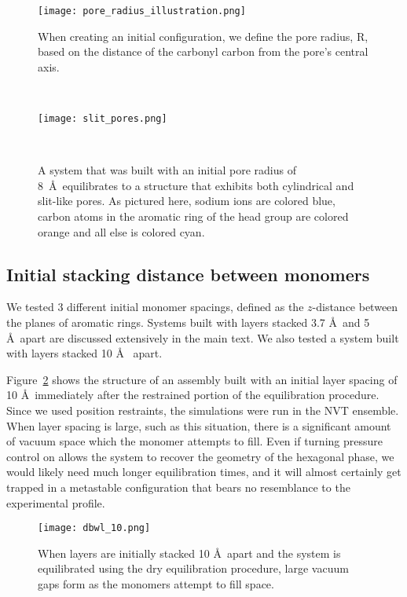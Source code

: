   \begin{figure}[!htb]
  \centering
  \begin{minipage}{0.475\textwidth}
  \centering
  \texttt{[image: pore\_radius\_illustration.png]}
  \caption{When creating an initial configuration, we define the pore radius,
  R, based on the distance of the carbonyl carbon from the pore's
  central axis.}~\label{S-fig:pore_radius_illustration}
  \end{minipage}\qquad
  \begin{minipage}{0.475\textwidth}
  \centering
  \vspace{4em}
  \texttt{[image: slit\_pores.png]}
  \vspace{1em}
  \caption{A system that was built with an initial pore radius of 8~\AA~equilibrates
  to a structure that exhibits both cylindrical and slit-like pores. As pictured 
  here, sodium ions are colored blue, carbon atoms in the aromatic ring of the head 
  group are colored orange and all else is colored cyan.}~\label{S-fig:slits}
  \end{minipage}
  \end{figure}

  \subsection{Initial stacking distance between monomers}\label{S-section:initial_dbwl}

  We tested 3 different initial monomer spacings, defined as the $z$-distance
  between the planes of aromatic rings. Systems built with layers
  stacked 3.7 \AA~and 5 \AA~apart are discussed extensively in the main text. We
  also tested a system built with layers stacked 10 \AA~ apart.

  Figure~\ref{S-fig:dbwl_10} shows the structure of an assembly built
  with an initial layer spacing of 10 \AA~immediately after the restrained
  portion of the equilibration procedure. Since we used position restraints, the
  simulations were run in the NVT ensemble. When layer spacing is large, such as
  this situation, there is a significant amount of vacuum space which the monomer
  attempts to fill. Even if turning pressure control on allows the system to
  recover the geometry of the hexagonal phase, we would likely need much longer
  equilibration times, and it will almost certainly get trapped in a metastable
  configuration that bears no resemblance to the experimental profile. 
 
  \begin{figure}[!htb]
	\centering
	\texttt{[image: dbwl\_10.png]}
	\caption{When layers are initially stacked 10 \AA~apart and the system
                is equilibrated using the dry equilibration procedure, large vacuum gaps
	form as the monomers attempt to fill space.}\label{S-fig:dbwl_10} 
  \end{figure}

